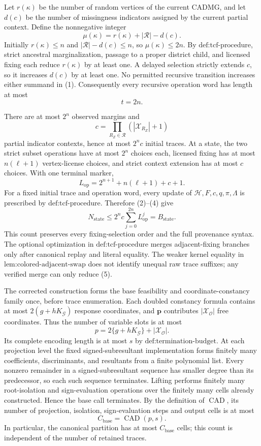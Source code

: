 Let \(r(\kappa)\) be the number of random vertices of the current CADMG, and let \(d(c)\) be the number of missingness indicators assigned by the current partial context. Define the nonnegative integer
\[
\mu(\kappa)=r(\kappa)+|\mathcal R|-d(c).
\tag{1}
\]
Initially \(r(\kappa)\leq n\) and \(|\mathcal R|-d(c)\leq n\), so \(\mu(\kappa)\leq2n\). By \(\text{def:tcf-procedure}\), strict ancestral marginalization, passage to a proper district child, and licensed fixing each reduce \(r(\kappa)\) by at least one. A delayed selection strictly extends \(c\), so it increases \(d(c)\) by at least one. No permitted recursive transition increases either summand in (1). Consequently every recursive operation word has length at most
\[
t=2n.
\tag{2}
\]

There are at most \(2^n\) observed margins and
\[
c=\prod_{R_Z\in\mathcal R}(|\mathcal X_{R_Z}|+1)
\tag{3}
\]
partial indicator contexts, hence at most \(2^n c\) initial traces. At a state, the two strict subset operations have at most \(2^n\) choices each, licensed fixing has at most \(n(\ell+1)\) vertex-license choices, and strict context extension has at most \(c\) choices. With one terminal marker,
\[
L_{\mathrm{op}}=2^{n+1}+n(\ell+1)+c+1.
\tag{4}
\]
For a fixed initial trace and operation word, every update of \(\mathcal H,F,c,q,\pi,\Lambda\) is prescribed by \(\text{def:tcf-procedure}\). Therefore (2)--(4) give
\[
N_{\mathrm{state}}
\leq2^n c\sum_{j=0}^{2n}L_{\mathrm{op}}^j
=B_{\mathrm{state}}.
\tag{5}
\]
This count preserves every fixing-selection order and the full provenance syntax. The optional optimization in \(\text{def:tcf-procedure}\) merges adjacent-fixing branches only after canonical replay and literal equality. The weaker kernel equality in \(\text{lem:colored-adjacent-swap}\) does not identify unequal raw trace suffixes; any verified merge can only reduce (5).

The corrected construction forms the base feasibility and coordinate-constancy family once, before trace enumeration. Each doubled constancy formula contains at most \(2(g+hK_{\mathcal G})\) response coordinates, and \(\mathbf p\) contributes \(|\mathcal X_{\mathcal O}|\) free coordinates. Thus the number of variable slots is at most
\[
p=2\{g+hK_{\mathcal G}\}+|\mathcal X_{\mathcal O}|.
\tag{6}
\]
Its complete encoding length is at most \(s\) by \(\text{def:termination-budget}\). At each projection level the fixed signed-subresultant implementation forms finitely many coefficients, discriminants, and resultants from a finite polynomial list. Every nonzero remainder in a signed-subresultant sequence has smaller degree than its predecessor, so each such sequence terminates. Lifting performs finitely many root-isolation and sign-evaluation operations over the finitely many cells already constructed. Hence the base call terminates. By the definition of \(\operatorname{CAD}\), its number of projection, isolation, sign-evaluation steps and output cells is at most
\[
C_{\mathrm{base}}=\operatorname{CAD}(p,s).
\tag{7}
\]
In particular, the canonical partition has at most \(C_{\mathrm{base}}\) cells; this count is independent of the number of retained traces.

